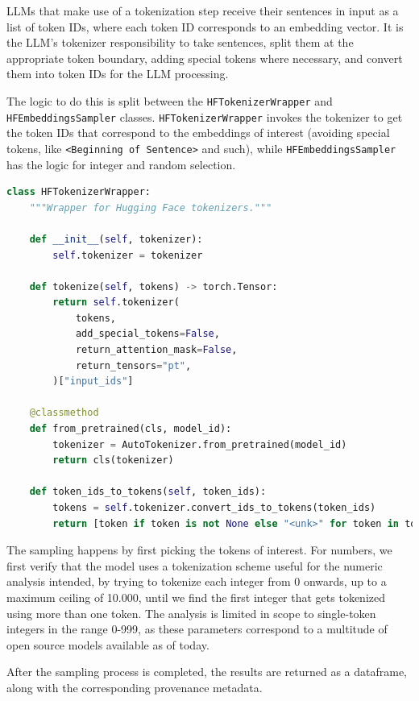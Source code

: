 \documentclass[
  a4paper, twoside, 10pt, titlepage]{book}
\begin{document}
LLMs that make use of a tokenization step receive their sentences in
input as a list of token IDs, where each token ID corresponds to an
embedding vector. It is the LLM's tokenizer responsibility to take
sentences, split them at the appropriate token boundary, adding special
tokens where necessary, and convert them into token IDs for the LLM
processing.

The logic to do this is split between the
\passthrough{\lstinline!HFTokenizerWrapper!} and
\passthrough{\lstinline!HFEmbeddingsSampler!} classes.
\passthrough{\lstinline!HFTokenizerWrapper!} invokes the tokenizer to
get the token IDs that correspond to the embeddings of interest
(avoiding special tokens, like
\passthrough{\lstinline!<Beginning of Sentence>!} and such), while
\passthrough{\lstinline!HFEmbeddingsSampler!} has the logic for integer
and random selection.

\begin{lstlisting}[language=Python]
class HFTokenizerWrapper:
    """Wrapper for Hugging Face tokenizers."""

    def __init__(self, tokenizer):
        self.tokenizer = tokenizer

    def tokenize(self, tokens) -> torch.Tensor:
        return self.tokenizer(
            tokens,
            add_special_tokens=False,
            return_attention_mask=False,
            return_tensors="pt",
        )["input_ids"]

    @classmethod
    def from_pretrained(cls, model_id):
        tokenizer = AutoTokenizer.from_pretrained(model_id)
        return cls(tokenizer)

    def token_ids_to_tokens(self, token_ids):
        tokens = self.tokenizer.convert_ids_to_tokens(token_ids)
        return [token if token is not None else "<unk>" for token in tokens]
\end{lstlisting}

The sampling happens by first picking the tokens of interest. For
numbers, we first verify that the model uses a tokenization scheme
useful for the numeric analysis intended, by trying to tokenize each
integer from 0 onwards, up to a maximum ceiling of 10.000, until we find
the first integer that gets tokenized using more than one token. The
analysis is limited in scope to single-token integers in the range
0-999, as these parameters correspond to a multitude of open source
models available as of today.

After the sampling process is completed, the results are returned as a
dataframe, along with the corresponding provenance metadata.
\end{document}
